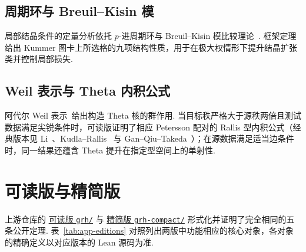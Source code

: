 \section{周期环与 Breuil--Kisin 模}

局部结晶条件的定量分析依托 $p$-进周期环与 Breuil--Kisin 模比较理论~\cite{Kisin2006,BhattScholze2023}. 框架定理给出 Kummer 图卡上所选格的九项结构性质，用于在极大权情形下提升结晶扩张类并控制局部损失.

\section{Weil 表示与 Theta 内积公式}

阿代尔 Weil 表示~\cite{Weil1964,Howe1989}给出构造 Theta 核的群作用. 当目标秩严格大于源秩两倍且测试数据满足尖锐条件时，可读版证明了相应 Petersson 配对的 Rallis 型内积公式（经典版本见 Li~\cite{Li1992}、Kudla--Rallis~\cite{KudlaRallis1994} 与 Gan--Qiu--Takeda~\cite{GQT2014}）；在源数据满足适当边条件时，同一结果还蕴含 Theta 提升在指定型空间上的单射性.

\chapter{可读版与精简版}
\label{app:edition-comparison}

上游仓库的
\href{https://github.com/lsernau/grh-lean/tree/72fead102f663d5c7a407964a13dc0cf9d977207/grh}{可读版 \texttt{grh/}}
与
\href{https://github.com/lsernau/grh-lean/tree/72fead102f663d5c7a407964a13dc0cf9d977207/grh-compact}{精简版 \texttt{grh-compact/}}
形式化并证明了完全相同的五条公开定理. 表~\ref{tab:app-editions} 对照列出两版中功能相应的核心对象，各对象的精确定义以对应版本的 Lean 源码为准.

